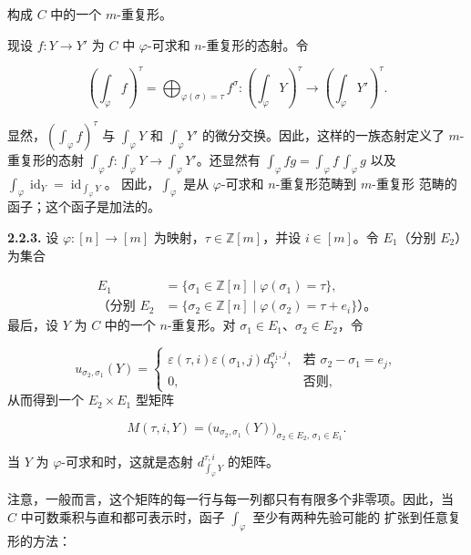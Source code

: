 \clearpage
{}%
%
构成 $C$ 中的一个 $m$-重复形。

现设 $f\colon Y\to Y'$ 为 $C$ 中 $\varphi$-可求和 $n$-重复形的态射。令

\begin{equation}
  \left(\int_\varphi f\right)^\tau
  =\bigoplus_{\varphi(\sigma)=\tau}f^\sigma\colon
  \left(\int_\varphi Y\right)^\tau
  \longrightarrow
  \left(\int_\varphi Y'\right)^\tau.
  \tag{2.2.2.6}
\end{equation}

显然，$\left(\int_\varphi f\right)^\tau$ 与 $\int_\varphi Y$ 和
$\int_\varphi Y'$ 的微分交换。因此，这样的一族态射定义了 $m$-重复形的态射
$\int_\varphi f\colon\int_\varphi Y\to\int_\varphi Y'$。还显然有
$\int_\varphi fg=\int_\varphi f\,\int_\varphi g$ 以及
$\int_\varphi\operatorname{id}_Y=\operatorname{id}_{\int_\varphi Y}$。
因此，$\int_\varphi$ 是从 $\varphi$-可求和 $n$-重复形范畴到 $m$-重复形
范畴的函子；这个函子是加法的。

\noindent\textbf{2.2.3.}\quad
设 $\varphi\colon[n]\to[m]$ 为映射，$\tau\in\mathbb Z[m]$，并设
$i\in[m]$。令 $E_1$（分别 $E_2$）为集合

\[
  \begin{aligned}
    E_1&=\{\sigma_1\in\mathbb Z[n]\mid\varphi(\sigma_1)=\tau\},\\
    \text{（分别 }E_2
      &=\{\sigma_2\in\mathbb Z[n]\mid
          \varphi(\sigma_2)=\tau+e_i\}\text{）。}
  \end{aligned}
\]
最后，设 $Y$ 为 $C$ 中的一个 $n$-重复形。对
$\sigma_1\in E_1$、$\sigma_2\in E_2$，令

\begin{equation}
  u_{\sigma_2,\sigma_1}(Y)
  =\begin{cases}
    \varepsilon(\tau,i)\varepsilon(\sigma_1,j)d_Y^{\sigma_1,j},
      &\text{若 }\sigma_2-\sigma_1=e_j,\\
    0,&\text{否则},
  \end{cases}
  \tag{2.2.3.1}
\end{equation}
从而得到一个 $E_2\times E_1$ 型矩阵

\begin{equation}
  M(\tau,i,Y)
  =\bigl(u_{\sigma_2,\sigma_1}(Y)\bigr)_{
    \sigma_2\in E_2,\,\sigma_1\in E_1}.
  \tag{2.2.3.2}
\end{equation}

当 $Y$ 为 $\varphi$-可求和时，这就是态射
$d_{\int_\varphi Y}^{\tau,i}$ 的矩阵。

注意，一般而言，这个矩阵的每一行与每一列都只有有限多个非零项。因此，当
$C$ 中可数乘积与直和都可表示时，函子 $\int_\varphi$ 至少有两种先验可能的
扩张到任意复形的方法：
